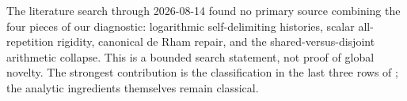 The literature search through 2026-08-14 found no primary source combining
the four pieces of our diagnostic: logarithmic self-delimiting histories,
scalar all-repetition rigidity, canonical de Rham repair, and the
shared-versus-disjoint arithmetic collapse.  This is a bounded search
statement, not proof of global novelty.  The strongest contribution is the
classification in the last three rows of ; the analytic
ingredients themselves remain classical.
